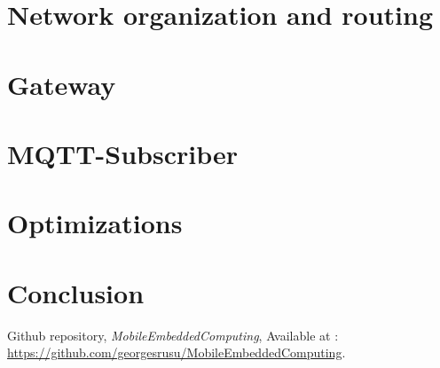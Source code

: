 \documentclass[a4paper,10pt]{article}
\begin{document}
\section{Network organization and routing}

\section{Gateway}
\section{MQTT-Subscriber}
\section{Optimizations}
\label{opti}

\section{Conclusion}

\begin{thebibliography}{9}

Github repository,
\textit{MobileEmbeddedComputing}, Available at :
\url{https://github.com/georgesrusu/MobileEmbeddedComputing}.


\end{thebibliography}
\end{document}
